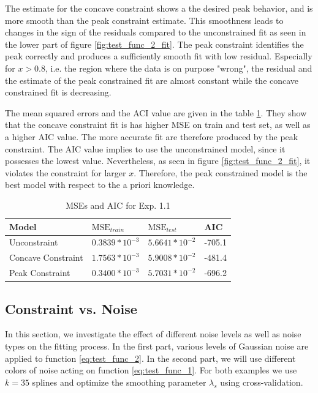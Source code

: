 \documentclass[10pt,a4paper]{article}
\begin{document}
The estimate for the concave constraint shows a the desired peak behavior, and is more smooth than the peak constraint estimate. This smoothness leads to changes in the sign of the residuals compared to the unconstrained fit as seen in the lower part of figure \ref{fig:test_func_2_fit}. The peak constraint identifies the peak correctly and produces a sufficiently smooth fit with low residual. Especially for $x >0.8$, i.e. the region where the data is on purpose "wrong", the residual and the estimate of the peak constrained fit are almost constant while the concave constrained fit is decreasing. 

The mean squared errors and the ACI value are given in the table \ref{tab:metrics_1-2}. They show that the concave constraint fit is has higher MSE on train and test set, as well as a higher AIC value. The more accurate fit are therefore produced by the peak constraint. The AIC value implies to use the unconstrained model, since it possesses the lowest value. Nevertheless, as seen in figure \ref{fig:test_func_2_fit}, it violates the constraint for larger $x$. Therefore, the peak constrained model is the best model with respect to the a priori knowledge. 

\begin{table}[h]
	\centering
	\begin{tabular}{|l|l|l|l|}
		\hline
		\textbf{Model} & \textbf{$\text{MSE}_{train}$} & \textbf{$\text{MSE}_{test}$}  & \textbf{AIC} \\ \hline \toprule
		Unconstraint        & $0.3839 * 10^{-3}$   & $5.6641 * 10^{-2}$ & -705.1       \\ \hline
		Concave Constraint  & $1.7563 * 10^{-3}$   & $5.9008 * 10^{-2}$ & -481.4       \\ \hline 
		Peak Constraint     & $0.3400 * 10^{-3}$   & $5.7031 * 10^{-2}$ & -696.2       \\ \hline \bottomrule
	\end{tabular}
	\caption{MSEs and AIC for Exp. 1.1}
	\label{tab:metrics_1-2}
\end{table}

\subsection{Constraint vs. Noise} \label{subsec:constraint-vs-noise}

In this section, we investigate the effect of different noise levels as well as noise types on the fitting process. In the first part, various levels of Gaussian noise are applied to function \ref{eq:test_func_2}. In the second part, we will use different colors of noise acting on function \ref{eq:test_func_1}. For both examples we use $k=35$ splines and optimize the smoothing parameter $\lambda_s$ using cross-validation. 
\end{document}
